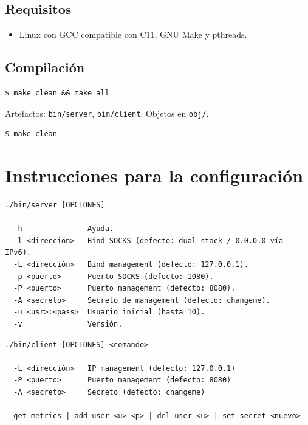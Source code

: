 \documentclass[12pt,a4paper]{article}
\begin{document}
\subsection{Requisitos}

\begin{itemize}
    \item Linux con GCC compatible con C11, GNU Make y pthreads.
\end{itemize}

\subsection{Compilación}

\begin{lstlisting}
$ make clean && make all
\end{lstlisting}

Artefactos: \texttt{bin/server}, \texttt{bin/client}. Objetos en \texttt{obj/}.

\begin{lstlisting}
$ make clean
\end{lstlisting}

\section{Instrucciones para la configuración}

\begin{lstlisting}[caption=Opciones del servidor]
./bin/server [OPCIONES]

  -h               Ayuda.
  -l <dirección>   Bind SOCKS (defecto: dual-stack / 0.0.0.0 vía IPv6).
  -L <dirección>   Bind management (defecto: 127.0.0.1).
  -p <puerto>      Puerto SOCKS (defecto: 1080).
  -P <puerto>      Puerto management (defecto: 8080).
  -A <secreto>     Secreto de management (defecto: changeme).
  -u <usr>:<pass>  Usuario inicial (hasta 10).
  -v               Versión.
\end{lstlisting}

\begin{lstlisting}[caption=Opciones del cliente]
./bin/client [OPCIONES] <comando>

  -L <dirección>   IP management (defecto: 127.0.0.1)
  -P <puerto>      Puerto management (defecto: 8080)
  -A <secreto>     Secreto (defecto: changeme)

  get-metrics | add-user <u> <p> | del-user <u> | set-secret <nuevo>
\end{lstlisting}
\end{document}
